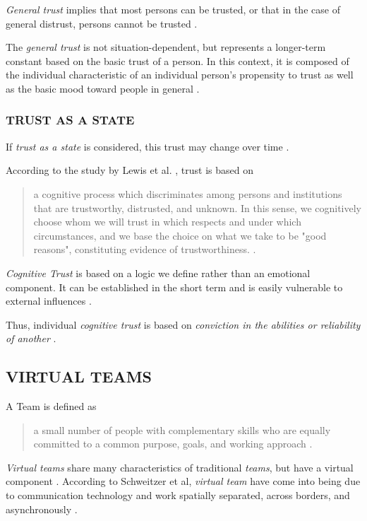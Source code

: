 \documentclass[sigchi]{acmart}
\begin{document}
\textit{General trust} implies that most persons can be trusted, or that in the case of general distrust, persons cannot be trusted \citep[p. 409]{stolle2002trusting}.

The \textit{general trust} is not situation-dependent, but represents a longer-term constant based on the basic trust of a person. In this context, it is composed of the individual characteristic of an individual person's propensity to trust as well as the basic mood toward people in general \citep[p. 11]{couch1996assessment}.

\subsubsection{TRUST AS A STATE}
If \textit{trust as a state} is considered, this trust may change over time \citep[p. 712]{mayer1995integrative}.

According to the study by Lewis et al. \citep[pp. 970-971]{lewis1985trust}, trust is based on
\begin{quote} \grqq{}a cognitive process which discriminates among persons and institutions that are trustworthy, distrusted, and unknown. In this sense, we cognitively choose whom we will trust in which respects and under which circumstances, and we base the choice on what we take to be "good reasons", constituting evidence of trustworthiness.\grqq{} \citep[S. 970]{lewis1985trust}.\end{quote}

\textit{Cognitive Trust} is based on a logic we define rather than an emotional component. It can be established in the short term and is easily vulnerable to external influences \citep[p. 970]{lewis1985trust}. 

Thus, individual \textit{cognitive trust} is based on \textit{conviction in the abilities or reliability of another} \citep[S. 30]{mcallister1995affect}.

\subsection{VIRTUAL TEAMS}
A Team is defined as \begin{quote}\grqq{}a small number of people with complementary skills who are equally committed to a common purpose, goals, and working approach\grqq{} \citep[S. 2]{zenun2007effects}. \end{quote}

\textit{Virtual teams} share many characteristics of traditional \textit{teams}, but have a virtual component \citep[S. 270]{schweitzer2010conceptualizing}.
According to Schweitzer et al, \textit{virtual team} have come into being due to communication technology and work spatially separated, across borders, and asynchronously \citep[p. 270]{schweitzer2010conceptualizing}.
\end{document}
